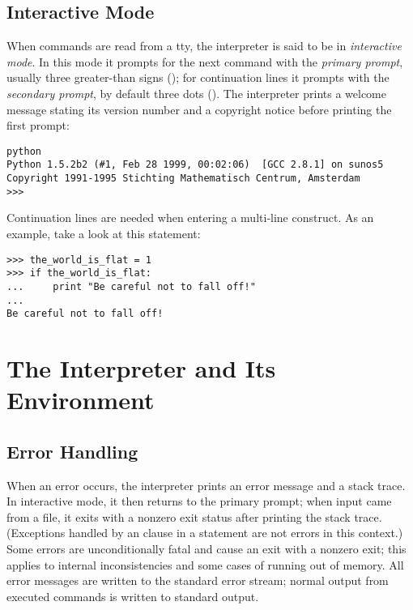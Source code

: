 \documentclass{manual}
\begin{document}
\subsection{Interactive Mode \label{interactive}}

When commands are read from a tty, the interpreter is said to be in
\emph{interactive mode}.  In this mode it prompts for the next command
with the \emph{primary prompt}, usually three greater-than signs
(\samp{>\code{>}>~}); for continuation lines it prompts with the
\emph{secondary prompt}, by default three dots ().
The interpreter prints a welcome message stating its version number
and a copyright notice before printing the first prompt:

\begin{verbatim}
python
Python 1.5.2b2 (#1, Feb 28 1999, 00:02:06)  [GCC 2.8.1] on sunos5
Copyright 1991-1995 Stichting Mathematisch Centrum, Amsterdam
>>>
\end{verbatim}

Continuation lines are needed when entering a multi-line construct.
As an example, take a look at this  statement:

\begin{verbatim}
>>> the_world_is_flat = 1
>>> if the_world_is_flat:
...     print "Be careful not to fall off!"
... 
Be careful not to fall off!
\end{verbatim}


\section{The Interpreter and Its Environment \label{interp}}

\subsection{Error Handling \label{error}}

When an error occurs, the interpreter prints an error
message and a stack trace.  In interactive mode, it then returns to
the primary prompt; when input came from a file, it exits with a
nonzero exit status after printing
the stack trace.  (Exceptions handled by an  clause in a
 statement are not errors in this context.)  Some errors are
unconditionally fatal and cause an exit with a nonzero exit; this
applies to internal inconsistencies and some cases of running out of
memory.  All error messages are written to the standard error stream;
normal output from executed commands is written to standard
output.
\end{document}
